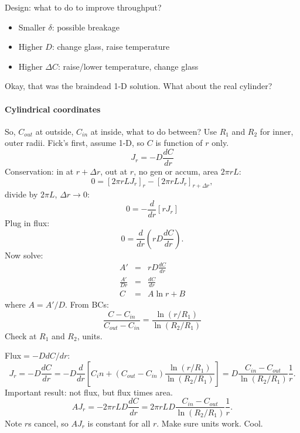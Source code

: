 \documentclass{report}
\begin{document}
\noindent Design: what to do to improve throughput?
\begin{itemize}
\item Smaller $\delta$: possible breakage
\item Higher $D$: change glass, raise temperature
\item Higher $\Delta C$: raise/lower temperature, change glass
\end{itemize}
Okay, that was the braindead 1-D solution.  What about the real cylinder?

\paragraph{Cylindrical coordinates}

So, $C_{out}$ at outside, $C_{in}$ at inside, what to do between?  Use $R_1$
and $R_2$ for inner, outer radii.  Fick's first, assume 1-D, so $C$ is function
of $r$ only.
\begin{equation}
  \label{eq:cylfick1}
  J_r = -D\frac{dC}{dr}
\end{equation}
Conservation: in at $r+\Delta r$, out at $r$, no gen or accum, area $2\pi r L$:
\begin{equation}
  \label{eq:cylconserv}
  0 = [2\pi r L J_r]_r - [2\pi r L J_r]_{r+\Delta r},
\end{equation}
divide by $2\pi L$, $\Delta r\rightarrow 0$:
\begin{equation}
  \label{eq:cyleq}
  0 = -\frac{d}{dr}[r J_r]
\end{equation}
Plug in flux:
\begin{equation}
  \label{eq:cyloverall}
  0 = \frac{d}{dr}\left(rD\frac{dC}{dr}\right).
\end{equation}
Now solve:
\begin{eqnarray}
  \label{eq:cyleqint}
  A' & = & r D\frac{dC}{dr} \\
  \frac{A'}{Dr} & = & \frac{dC}{dr} \\
  C & = & A \ln r + B
\end{eqnarray}
where $A=A'/D$.  From BCs:
\begin{equation}
  \label{eq:cylintsol}
  \frac{C-C_{in}}{C_{out}-C_{in}} = \frac{\ln (r/R_1)}{\ln (R_2/R_1)}
\end{equation}
Check at $R_1$ and $R_2$, units.

\noindent Flux$=-D dC/dr$:
\begin{equation}
  \label{eq:cylflux}
  J_r = -D\frac{dC}{dr} = -D \frac{d}{dr}
  \left[C_in + (C_{out}-C_{in})\frac{\ln (r/R_1)}{\ln (R_2/R_1)}\right] =
  D\frac{C_{in}-C_{out}}{\ln (R_2/R_1)}\frac{1}{r}.
\end{equation}
Important result: not flux, but flux times area.
\begin{equation}
  \label{eq:cylfluxarea}
  AJ_r = -2\pi r L D\frac{dC}{dr} =
  2\pi r L D \frac{C_{in}-C_{out}}{\ln (R_2/R_1)}\frac{1}{r}.
\end{equation}
Note $r$s cancel, so $AJ_r$ is constant for all $r$.  Make sure units work.
Cool.
\end{document}
